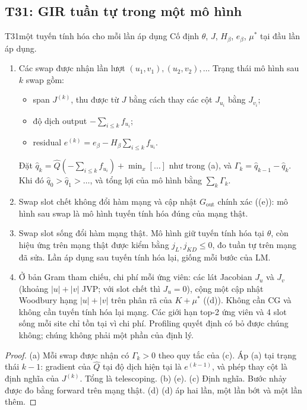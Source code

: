 \subsection{T31: GIR tuần tự trong một mô hình}

\begin{namedthm}{T31}{một tuyến tính hóa cho mỗi lần áp dụng}
Cố định $\theta$, $J$, $H_\beta$, $e_\beta$, $\mu^*$ tại đầu lần áp dụng.
\begin{enumerate}[label=(\alph*)]
\item Các swap được nhận lần lượt $(u_1,v_1),(u_2,v_2),\dots$ Trạng thái mô hình sau $k$ swap gồm:
\begin{itemize}
\item span $J^{(k)}$, thu được từ $J$ bằng cách thay các cột $J_{u_i}$ bằng $J_{v_i}$;
\item độ dịch output $-\sum_{i\le k}f_{u_i}$;
\item residual $e^{(k)}=e_\beta-H_\beta\sum_{i\le k}f_{u_i}$.
\end{itemize}
Đặt $\hat q_k=\hat Q(-\sum_{i\le k}f_{u_i})+\min_x[\dots]$ như trong (a), và $\Gamma_k=\hat q_{k-1}-\hat q_k$. Khi đó $\hat q_0>\hat q_1>\dots$, và tổng lợi của mô hình bằng $\sum_k\Gamma_k$.
\item Swap slot chết không đổi hàm mạng và cập nhật $G_{\mathrm{out}}$ chính xác ((e)): mô hình sau swap là mô hình tuyến tính hóa đúng của mạng thật.
\item Swap slot sống đổi hàm mạng thật. Mô hình giữ tuyến tính hóa tại $\theta$, còn hiệu ứng trên mạng thật được kiểm bằng $j_L,j_{KD}\le0$, đo tuần tự trên mạng đã sửa. Lần áp dụng sau tuyến tính hóa lại, giống mỗi bước của LM.
\item Ở bản Gram tham chiếu, chi phí mỗi ứng viên: các lát Jacobian $J_u$ và $J_v$ (khoảng $|u|+|v|$ JVP; với slot chết thì $J_u=0$), cộng một cập nhật Woodbury hạng $|u|+|v|$ trên phân rã của $K+\mu^*$ ((d)). Không cần CG và không cần tuyến tính hóa lại mạng. Các giới hạn top-2 ứng viên và 4 slot sống mỗi site chỉ tồn tại vì chi phí. Profiling quyết định có bỏ được chúng không; chúng không phải một phần của định lý.
\end{enumerate}
\end{namedthm}
\begin{proof}
(a) Mỗi swap được nhận có $\Gamma_k>0$ theo quy tắc của (c). Áp (a) tại trạng thái $k-1$: gradient của $\hat Q$ tại độ dịch hiện tại là $e^{(k-1)}$, và phép thay cột là định nghĩa của $J^{(k)}$. Tổng là telescoping.
(b) (e).
(c) Định nghĩa. Bước nhảy được đo bằng forward trên mạng thật.
(d) (d) áp hai lần, một lần bớt và một lần thêm.
\end{proof}
